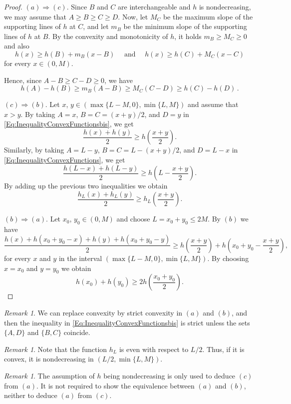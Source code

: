 \documentclass[12pt,reqno]{amsart}
\theoremstyle{definition}
\theoremstyle{remark}
\newtheorem{remark}[theorem]{Remark}
\numberwithin{equation}{section}
\begin{document}
\begin{proof}
	$(a)\Rightarrow (c)$.	Since $B$ and $C$ are interchangeable and $h$ is nondecreasing, we may assume that $A \geq B \geq C \geq D$. Now, let $M_C$ be the maximum slope of the supporting lines of $h$ at $C$, and let $m_B$ be the minimum slope of the supporting lines of $h$ at $B$. By the convexity and monotonicity of $h$, it holds $m_B \geq M_C\geq 0$ and also
	$$
	h(x) \geq h(B) + m_B (x-B) \quad \text{ and } \quad h(x) \geq h(C) + M_C (x-C) 
	$$
	for every $x \in (0,M)$.
	
	Hence, since $A-B \geq C-D\geq 0$, we have
	$$
	h(A)-h(B) \geq m_B(A-B) \geq M_C (C-D) \geq h(C) - h(D)\,.
	$$
	
	$(c) \Rightarrow (b)$. Let $x$, $y\in (\max \{L-M,0\}, \min \{L,M\})$ and assume that $x>y$. By taking $A=x$, $B=C=(x+y)/2$, and $D = y$ in \eqref{Eq:InequalityConvexFunctionsbis}, we get 
	$$
	\dfrac{h(x) + h(y)}{2} \geq h \left( \dfrac{x+y}{2}\right). 
	$$ 
	Similarly, by taking $A= L-y$, $B=C=L -(x+y)/2$, and $D = L-x$ in \eqref{Eq:InequalityConvexFunctions}, we get 
	$$
	\dfrac{h(L-x) + h(L-y)}{2} \geq h \left(L - \dfrac{x+y}{2}\right). 
	$$
	By adding up the previous two inequalities we obtain
	$$
	\dfrac{h_L(x) + h_L(y)}{2} \geq h_L \left( \dfrac{x+y}{2}\right). 
	$$ 
	
	$(b) \Rightarrow (a)$. Let $x_0$, $y_0 \in (0,M)$ and choose $L = x_0 + y_0 \leq 2M$. By $(b)$ we have 
	$$
	\dfrac{h(x) + h(x_0 + y_0-x) + h(y) + h(x_0 + y_0-y)}{2} \geq h \left( \dfrac{x+y}{2}\right) + h \left(x_0 + y_0 - \dfrac{x+y}{2}\right),
	$$
	for every $x$ and $y$ in the interval $(\max \{L-M,0\}, \min \{L,M\})$. By choosing $x=x_0$ and $y=y_0$ we obtain
	$$
	h(x_0) + h(y_0)\geq 2 h \left( \dfrac{x_0+y_0}{2}\right). 
	$$
\end{proof}


\begin{remark}
	\label{Remark:StrictConvexity}
	We can replace convexity by strict convexity in $(a)$ and $(b)$, and then the inequality in \eqref{Eq:InequalityConvexFunctionsbis} is strict unless the sets $\{A,D\}$ and $\{B,C\}$ coincide.
\end{remark}

\begin{remark}
	\label{Remark:h_Lincreasing}
	Note that the function $h_L$ is even with respect to $L/2$. Thus, if it is convex, it is nondecreasing in $(L/2, \min \{L,M\})$.
\end{remark}

\begin{remark}
	\label{Remark:hypothesisNondecreasing}
	The assumption of $h$ being nondecreasing is only used to deduce $(c)$ from $(a)$. It is not required to show the equivalence between $(a)$ and $(b)$, neither to deduce $(a)$ from $(c)$.
\end{remark}
\end{document}
